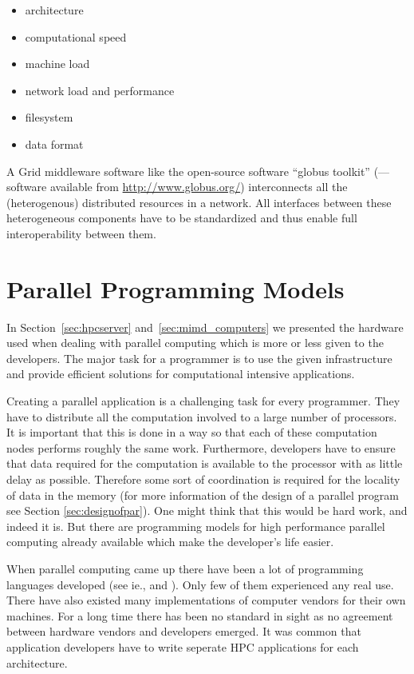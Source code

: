 \begin{itemize}
\item architecture
\item computational speed
\item machine load
\item network load and performance
\item filesystem
\item data format
\end{itemize}

A Grid middleware software like the open-source software ``globus
toolkit'' (\cite{foster97gmi}---software available from
\url{http://www.globus.org/}) interconnects all the (heterogenous)
distributed resources in a network.
All interfaces between these heterogeneous components have to be standardized
and thus enable full interoperability between them.

\section{Parallel Programming Models}
\label{sec:programming_models}

In Section~\ref{sec:hpcserver} and~\ref{sec:mimd_computers} we
presented the hardware used when dealing with parallel computing which is
more or less given to the developers. The major task for a programmer
is to use the given infrastructure and provide efficient solutions for
computational intensive applications.

Creating a parallel application is a challenging task for every
programmer. They have to distribute all
the computation involved to a large number of processors. It is
important that this is done in a way so that each of these computation
nodes performs roughly the same work. Furthermore, developers have to
ensure that data required for the computation is available to the
processor with as little delay as possible. Therefore some sort of
coordination is required for the locality of data in the memory (for
more information of the design of a parallel program see Section
\ref{sec:designofpar}). 
One might think that this would be hard work, and indeed it is. But
there are programming models for high performance parallel computing
already available which make the developer's life easier.


When parallel computing came up there have been a lot of programming
languages developed (see ie., \cite{gehani88:concurrentprog} and
\cite{wilson96:parallelprog}). Only few of them experienced any real use. There
have also existed many implementations of computer vendors for their own
machines. For a long time there has been no standard in sight as no
agreement between hardware vendors and developers emerged. It was
common that application developers have to write seperate HPC
applications for each architecture.

